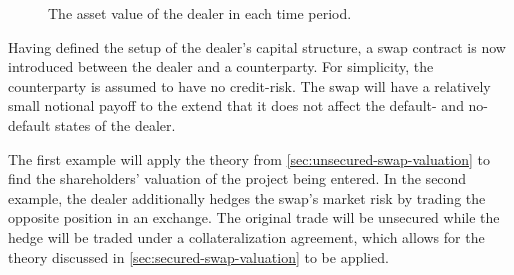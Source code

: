 \documentclass[main.tex]{subfiles}
\begin{document}
        \begin{figure}[H]
            \centering
            \caption{The asset value of the dealer in each time period.}
            \label{fig:example-asset-value-multi-period-dealer}
        \end{figure}

        Having defined the setup of the dealer's capital structure,
        a swap contract is now introduced between the dealer and a counterparty.
        For simplicity, the counterparty is assumed to have no credit-risk.
        The swap will have a relatively small notional payoff to the extend
        that it does not affect the default- and no-default states of the dealer.

        The first example will apply the theory from \cref{sec:unsecured-swap-valuation}
        to find the shareholders' valuation of the project being entered.
       In the second example, the dealer additionally hedges the swap's market risk 
       by trading the opposite position in an exchange.
       The original trade will be unsecured 
       while the hedge will be traded under a collateralization agreement,
       which allows for the theory discussed in \cref{sec:secured-swap-valuation} to be applied.
\end{document}
